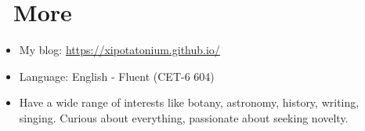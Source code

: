 \documentclass{resume}
\begin{document}
\section{\faInfo\ More}
\begin{itemize}[parsep=0.25ex]
  \item My blog: \url{https://xipotatonium.github.io/}
  \item Language: English - Fluent (CET-6 604)
  \item Have a wide range of interests like botany, astronomy, history, writing, singing. 
        Curious about everything, passionate about seeking novelty.
\end{itemize}
\end{document}

